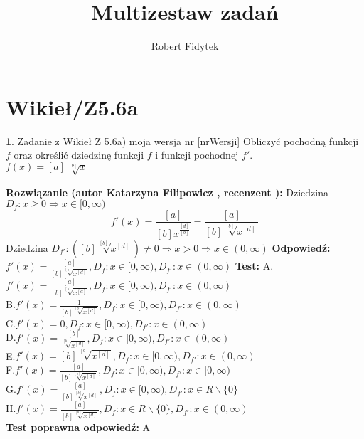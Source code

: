 \documentclass[12pt, a4paper]{article}
\title{Multizestaw zadań}
\author{Robert Fidytek}
\date{}
\theoremstyle{definition} %
\newtheorem{zad}{}
\newcommand{\kategoria}[1]{\section{#1}} %
\newcommand{\zadStart}[1]{\begin{zad}#1\newline} %
\newcommand{\zadStop}{\end{zad}}   %
\newcommand{\rozwStart}[2]{\noindent \textbf{Rozwiązanie (autor #1 , recenzent #2): }\newline} %
\newcommand{\rozwStop}{\newline}                                            %
\newcommand{\odpStart}{\noindent \textbf{Odpowiedź:}\newline}    %
\newcommand{\odpStop}{\newline}                                             %
\newcommand{\testStart}{\noindent \textbf{Test:}\newline} %
\newcommand{\testStop}{\newline} %
\newcommand{\kluczStart}{\noindent \textbf{Test poprawna odpowiedź:}\newline} %
\newcommand{\kluczStop}{\newline} %
\begin{document}
\maketitle


\kategoria{Wikieł/Z5.6a}
\zadStart{Zadanie z Wikieł Z 5.6a) moja wersja nr [nrWersji]}
Obliczyć pochodną funkcji $f$ oraz określić dziedzinę funkcji $f$ i funkcji pochodnej $f'$.\\
$f(x)=[a]\sqrt[[b]]{x}$
\zadStop
\rozwStart{Katarzyna Filipowicz}{}
Dziedzina $D_f: x \geq 0 \Rightarrow x \in [0,\infty)$
$$
f'(x)=\frac{[a]}{[b]x^{\frac{[d]}{[b]}}}=\frac{[a]}{[b] \sqrt[[b]]{x^{[d]}}}
$$
Dziedzina $D_{f'}: ([b] \sqrt[[b]]{x^{[d]}}) \neq 0 \Rightarrow x > 0 \Rightarrow   x \in (0,\infty)$
\rozwStop
\odpStart
$f'(x)=\frac{[a]}{[b] \sqrt[[b]]{x^{[d]}}},  D_{f}:x \in [0,\infty), D_{f'}:x \in (0,\infty)$
\odpStop
\testStart
A.$f'(x)=\frac{[a]}{[b] \sqrt[[b]]{x^{[d]}}}, D_{f}:x \in [0,\infty), D_{f'}:x \in (0,\infty)$\\
B.$f'(x)=\frac{1}{[b] \sqrt[[b]]{x^{[d]}}}, D_{f}:x \in [0,\infty), D_{f'}:x \in (0,\infty)$\\
C.$f'(x)=0, D_{f}:x \in [0,\infty), D_{f'}:x \in (0,\infty)$\\
D.$f'(x)=\frac{[b]}{ \sqrt[[b]]{x^{[d]}}}, D_{f}:x \in [0,\infty), D_{f'}:x \in (0,\infty)$\\
E.$f'(x)=[b] \sqrt[[b]]{x^{[d]}}, D_{f}:x \in [0,\infty), D_{f'}:x \in (0,\infty)$\\
F.$f'(x)=\frac{[a]}{[b] \sqrt[[b]]{x^{[d]}}}, D_{f}:x \in [0,\infty), D_{f'}:x \in [0,\infty)$\\
G.$f'(x)=\frac{[a]}{[b] \sqrt[[b]]{x^{[d]}}}, D_{f}:x \in [0,\infty), D_{f'}:x \in R\backslash \{0\}$\\
H.$f'(x)=\frac{[a]}{[b] \sqrt[[b]]{x^{[d]}}}, D_{f}:x \in R\backslash \{0\}, D_{f'}:x \in (0,\infty)$\\
\testStop
\kluczStart
A
\kluczStop
\end{document}
